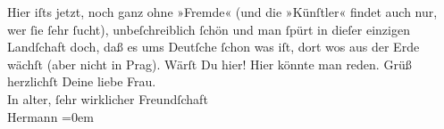 \begin{ledgroupsized}[t]{13cm}
           Hier iſts jetzt, noch ganz ohne »Fremde« (und die »Künſtler« findet auch nur, wer ſie
               ſehr ſucht), unbeſchreiblich ſchön und man ſpürt in dieſer einzigen Landſchaft doch,
               daß es ums Deutſche ſchon was iſt, dort wos aus der Erde wächſt (aber nicht in Prag).\pend
           \pstart
           Wärſt Du hier!\pend
           \pstart
           Hier könnte man reden.\pend
           \pstart
           Grüß herzlichſt Deine liebe Frau.{\\[\baselineskip]}In alter, ſehr wirklicher Freundſchaft{\\[\baselineskip]}\spacefill\mbox{Hermann}\pend
           \leftskip=0em{}          \endnumbering{}\end{ledgroupsized}  \newcommand{\dateiname}{L01851}\newcommand{\titel}{Hermann Bahr an Arthur Schnitzler, 28. 6. 1909}\newcommand{\editorInnen}{ Kurt Ifkovits,  Martin Anton Müller}
      